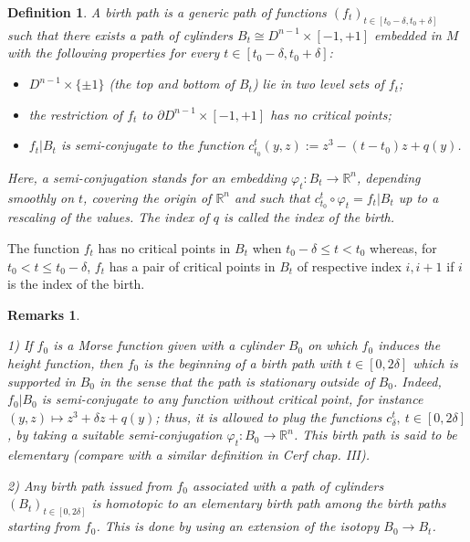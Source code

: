 \documentclass[12pt]{amsart}
\newtheorem{defn}[thm]{Definition}
\newtheorem{remarques}[thm]{Remarks}
\def\R{\mathbb{R}}
\def\de{\delta}
\def\vp{\varphi}
\begin{document}
\begin{defn} \label{birth} A birth path is a generic path of functions $\left(f_t\right)_{t\in [t_0-\de,t_0+\de]}$
such that there exists a path of 
cylinders $B_t\cong D^{n-1}\times [-1,+1]$ embedded in $M$
with the following properties for every $t\in [t_0-\de,t_0+\de]$:
\begin{itemize}
\item $D^{n-1}\times \{\pm 1\}$ (the top and bottom of $B_t$) lie in two level sets of $f_t$;
\item  the restriction of $f_t$ to $\partial D^{n-1}\times [-1,+1]$ has no critical points;
\item $f_t \vert B_t$ is semi-conjugate to  the function $c_{t_0}^t(y,z):= z^3-(t-t_0)z +q(y)$. 
\end{itemize}
Here, a semi-conjugation stands  for an embedding $\vp_t: B_t\to\R^n$, 
depending smoothly on $t$, covering the origin of $\R^n$ and such that 
$c_{t_0}^t\circ \vp_t=f_t\vert B_t$ up to a rescaling of the values. 
The index of $q$ is  called the {index of the birth}. %
\end{defn}
The function $f_{t}$ has no critical points in $B_{t}$ when $t_0-\de\leq t<t_0$
whereas, for $t_0<t\leq t_0-\de$,
 $f_{t}$ has a pair of critical points in $B_{t}$ of respective index $i, i+1$ if $i$ is the index of the birth. 
 

\begin{remarques}\label{birth-uniq}{\rm 
 1)  If $f_0$ is a Morse function given with a cylinder $B_0$ on which $f_0$ induces the height function, then
$f_0$ is the beginning  of a birth path with $t\in [0,2\de]$ which is supported in $B_0$ in the sense  that 
 the path is stationary
outside of $B_0$. Indeed,  $f_0\vert B_0$ is semi-conjugate to any  function without critical point,
for instance $(y,z)\mapsto z^3+ \de z + q(y)$; thus, it is allowed to plug
 the functions $c_\de^t, \ t\in [0,2\de]$,
by taking a suitable semi-conjugation $\vp_t: B_0\to\R^n$. This birth path is said to be  {\it elementary} 
(compare with a similar definition  in  Cerf \cite{cerf} chap. III).

2) Any birth path issued from $f_0$ associated with a path of cylinders $\left(B_t\right)_{t\in [0,2\de]}$
is homotopic  to an elementary birth path among the birth paths starting from  $f_0$. This is done by using
an extension of the isotopy $B_0\to B_t$.
}
\end{remarques}
\end{document}
